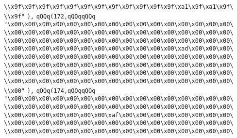\verb|\\x9f\x9f\x9f\x9f\x9f\x9f\x9f\x9f\x9f\x9f\x9f\x9f\xa1\x9f\xa1\x9f\|\newline
\verb|\\x9f"|\newline
\verb|),|\newline
\verb|qQQq(172,qQQqqQQq|\newline
\verb|"\x00\x00\x00\x00\x00\x00\x00\x00\x00\x00\x00\x00\x00\x00\x00\x00\|\newline
\verb|\\x00\x00\x00\x00\x00\x00\x00\x00\x00\x00\x00\x00\x00\x00\x00\x00\|\newline
\verb|\\x00\x00\x00\x00\x00\x00\x00\x00\x00\x00\x00\x00\x00\x00\x00\x00\|\newline
\verb|\\x00\x00\x00\x00\x00\x00\x00\x00\x00\x00\x00\x00\xad\x00\x00\x00\|\newline
\verb|\\x00\x00\x00\x00\x00\x00\x00\x00\x00\x00\x00\x00\x00\x00\x00\x00\|\newline
\verb|\\x00\x00\x00\x00\x00\x00\x00\x00\x00\x00\x00\x00\x00\x00\x00\x00\|\newline
\verb|\\x00\x00\x00\x00\x00\x00\x00\x00\x00\x00\x00\x00\x00\x00\x00\x00\|\newline
\verb|\\x00\x00\x00\x00\x00\x00\x00\x00\x00\x00\x00\x00\x00\x00\x00\x00\|\newline
\verb|\\x00"|\newline
\verb|),|\newline
\verb|qQQq(174,qQQqqQQq|\newline
\verb|"\x00\x00\x00\x00\x00\x00\x00\x00\x00\x00\x00\x00\x00\x00\x00\x00\|\newline
\verb|\\x00\x00\x00\x00\x00\x00\x00\x00\x00\x00\x00\x00\x00\x00\x00\x00\|\newline
\verb|\\x00\x00\x00\x00\x00\x00\x00\xaf\x00\x00\x00\x00\x00\x00\x00\x00\|\newline
\verb|\\x00\x00\x00\x00\x00\x00\x00\x00\x00\x00\x00\x00\x00\x00\x00\x00\|\newline
\verb|\\x00\x00\x00\x00\x00\x00\x00\x00\x00\x00\x00\x00\x00\x00\x00\x00\|\newline
